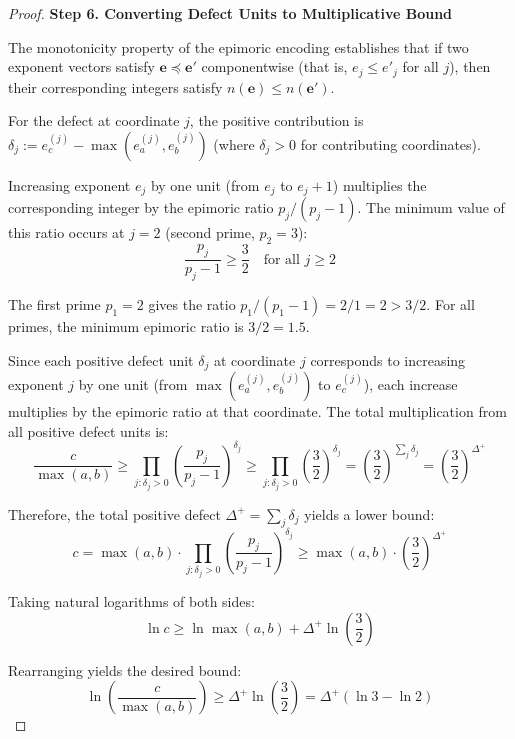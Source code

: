 \begin{proof}
\noindent \textbf{Step 6. Converting Defect Units to Multiplicative Bound}

The monotonicity property of the epimoric encoding establishes that if two exponent vectors satisfy $\mathbf{e} \preceq \mathbf{e}'$ componentwise (that is, $e_j \leq e'_j$ for all $j$), then their corresponding integers satisfy $n(\mathbf{e}) \leq n(\mathbf{e}')$.

For the defect at coordinate $j$, the positive contribution is $\delta_j := e_c^{(j)} - \max(e_a^{(j)}, e_b^{(j)})$ (where $\delta_j > 0$ for contributing coordinates).

Increasing exponent $e_j$ by one unit (from $e_j$ to $e_j + 1$) multiplies the corresponding integer by the epimoric ratio $p_j / (p_j - 1)$. The minimum value of this ratio occurs at $j = 2$ (second prime, $p_2 = 3$):
\begin{equation}
\frac{p_j}{p_j - 1} \geq \frac{3}{2} \quad \text{for all } j \geq 2
\end{equation}

The first prime $p_1 = 2$ gives the ratio $p_1 / (p_1 - 1) = 2/1 = 2 > 3/2$. For all primes, the minimum epimoric ratio is $3/2 = 1.5$.

Since each positive defect unit $\delta_j$ at coordinate $j$ corresponds to increasing exponent $j$ by one unit (from $\max(e_a^{(j)}, e_b^{(j)})$ to $e_c^{(j)}$), each increase multiplies by the epimoric ratio at that coordinate. The total multiplication from all positive defect units is:
\begin{equation}
\frac{c}{\max(a,b)} \geq \prod_{j: \delta_j > 0} \left(\frac{p_j}{p_j - 1}\right)^{\delta_j} \geq \prod_{j: \delta_j > 0} \left(\frac{3}{2}\right)^{\delta_j} = \left(\frac{3}{2}\right)^{\sum_j \delta_j} = \left(\frac{3}{2}\right)^{\Delta^{+}}
\end{equation}

Therefore, the total positive defect $\Delta^{+} = \sum_j \delta_j$ yields a lower bound:
\begin{equation}
c = \max(a,b) \cdot \prod_{j: \delta_j > 0} \left(\frac{p_j}{p_j-1}\right)^{\delta_j} \geq \max(a,b) \cdot \left(\frac{3}{2}\right)^{\Delta^{+}}
\end{equation}

Taking natural logarithms of both sides:
\begin{equation}
\ln c \geq \ln \max(a,b) + \Delta^{+} \ln\left(\frac{3}{2}\right)
\end{equation}

Rearranging yields the desired bound:
\begin{equation}
\ln\left(\frac{c}{\max(a,b)}\right) \geq \Delta^{+} \ln\left(\frac{3}{2}\right) = \Delta^{+} (\ln 3 - \ln 2)
\end{equation}


\end{proof}
